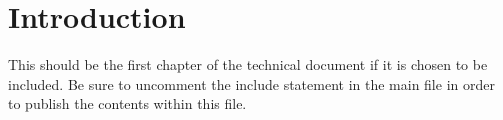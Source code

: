 \chapter{Introduction}
\label{ch:intro}
This should be the first chapter of the technical document if it is chosen to be included. Be sure to uncomment the include statement in the main file in order to publish the contents within this file.
